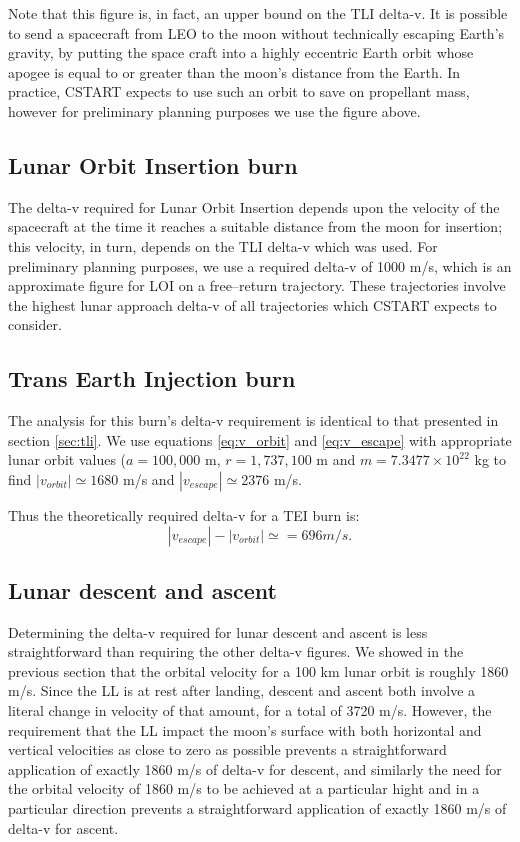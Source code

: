 \documentclass{report}
\begin{document}
Note that this figure is, in fact, an upper bound on the TLI delta-v.  It is possible to send a spacecraft from LEO to the moon without technically escaping Earth's gravity, by putting the space craft into a highly eccentric Earth orbit whose apogee is equal to or greater than the moon's distance from the Earth.  In practice, CSTART expects to use such an orbit to save on propellant mass, however for preliminary planning purposes we use the figure above.

\subsection{Lunar Orbit Insertion burn}

The delta-v required for Lunar Orbit Insertion depends upon the velocity of the spacecraft at the time it reaches a suitable distance from the moon for insertion; this velocity, in turn, depends on the TLI delta-v which was used.  For preliminary planning purposes, we use a required delta-v of 1000 m/s, which is an approximate figure for LOI on a free--return trajectory.  These trajectories involve the highest lunar approach delta-v of all trajectories which CSTART expects to consider.

\subsection{Trans Earth Injection burn}

The analysis for this burn's delta-v requirement is identical to that presented in section \ref{sec:tli}.  We use equations \ref{eq:v_orbit} and \ref{eq:v_escape} with appropriate lunar orbit values ($a = 100,000$ m, $r = 1,737,100$ m and $m = 7.3477 \times 10^{22}$ kg to find $|v_{orbit}| \simeq 1680$ m/s and $|v_{escape}| \simeq 2376$ m/s.

Thus the theoretically required delta-v for a TEI burn is:
\begin{equation}
|v_{escape}| - |v_{orbit}| \simeq = 696 m/s.
\end{equation}

\subsection{Lunar descent and ascent}

Determining the delta-v required for lunar descent and ascent is less straightforward than requiring the other delta-v figures.  We showed in the previous section that the orbital velocity for a 100 km lunar orbit is roughly 1860 m/s.  Since the LL is at rest after landing, descent and ascent both involve a literal change in velocity of that amount, for a total of 3720 m/s.  However, the requirement that the LL impact the moon's surface with both horizontal and vertical velocities as close to zero as possible prevents a straightforward application of exactly 1860 m/s of delta-v for descent, and similarly the need for the orbital velocity of 1860 m/s to be achieved at a particular hight and in a particular direction prevents a straightforward application of exactly 1860 m/s of delta-v for ascent.
\end{document}

